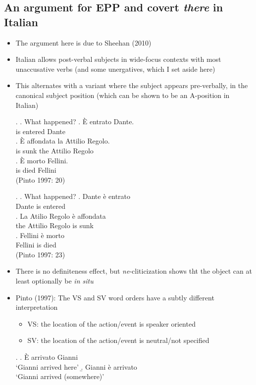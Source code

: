 \documentclass[letterpaper,10pt]{handout_nick}
\begin{document}
\subsection{An argument for EPP and covert \emph{there} in Italian}
\begin{itemize}
\item The argument here is due to Sheehan (2010)
\item Italian allows post-verbal subjects in wide-focus contexts with most unaccusative verbs (and some unergatives, which I set aside here)
\item This alternates with a variant where the subject appears pre-verbally, in the canonical subject position (which can be shown to be an A-position in Italian)
\begin{multicols}{2}
\ex. 
\a. What happened?
\bg. \`E entrato Dante.\\
is entered Dante\\
\bg. \`E affondata la Attilio Regolo.\\
is sunk the Attilio Regolo\\
\bg. \`E morto Fellini.\\
is died Fellini\\
(Pinto 1997: 20)

\ex. \a. What happened?
\bg. Dante \`e entrato\\
Dante is entered\\
\bg. La Atilio Regolo \`e affondata\\
the Attilio Regolo is sunk\\
\bg. Fellini \`e morto\\
Fellini is died\\
(Pinto 1997: 23)

\end{multicols}
\item There is no definiteness effect, but \emph{ne}-cliticization shows tht the object can at least optionally be \emph{in situ}
 
\item Pinto (1997): The VS and SV word orders have a subtly different interpretation
\begin{itemize} 
\item VS: the location of the action/event is speaker oriented
\item SV: the location of the action/event is neutral/not specified
\end{itemize}
\ex. \a. \`E arrivato Gianni\\
`Gianni arrived here'
\b. Gianni \`e arrivato\\
`Gianni arrived (somewhere)'


\end{itemize}
\end{document}
